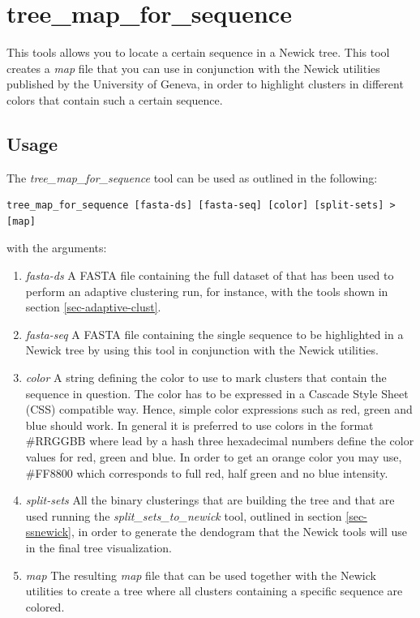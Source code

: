 \section{tree\_map\_for\_sequence} \label{sec-treemapseq}

This tools allows you to locate a certain sequence in a Newick tree. This
tool creates a \emph{map} file that you can use in conjunction with the
Newick utilities \cite{newick_tools} published by the University of Geneva, in
order to highlight clusters in different colors that contain such a certain
sequence.

\subsection{Usage}

The \emph{tree\_map\_for\_sequence} tool can be used as outlined
in the following:
\begin{lstlisting}
tree_map_for_sequence [fasta-ds] [fasta-seq] [color] [split-sets] > [map]
\end{lstlisting}
with the arguments:
\begin{enumerate}
  \item \emph{fasta-ds} A FASTA file containing the full dataset of
    that has been used to perform an adaptive clustering run, for instance,
    with the
    tools shown in section \ref{sec-adaptive-clust}.
  \item \emph{fasta-seq} A FASTA file containing the single sequence
    to be highlighted in a Newick tree by using this tool in conjunction
    with the Newick utilities.
  \item \emph{color} A string defining the color to use to mark
    clusters that contain the sequence in question. The color has to
    be expressed in a Cascade Style Sheet (CSS) compatible way. Hence,
    simple color expressions such as red, green and blue should
    work. In general it is preferred to use colors in the format
    \#RRGGBB where lead by a hash three hexadecimal numbers define the
    color values for red, green and blue. In order to
    get an orange color you may use, \#FF8800 which corresponds to
    full red, half green and no blue intensity. 
  \item \emph{split-sets} All the binary clusterings that are building the
    tree and that are used running the
    \emph{split\_sets\_to\_newick} tool, outlined in section
    \ref{sec-ssnewick}, in order to generate the
    dendogram that the Newick tools will
    use in the final tree visualization.
  \item \emph{map}
    The resulting \emph{map} file that can be used together with the
    Newick utilities to create a tree where all clusters containing
    a specific sequence are colored.
\end{enumerate}

